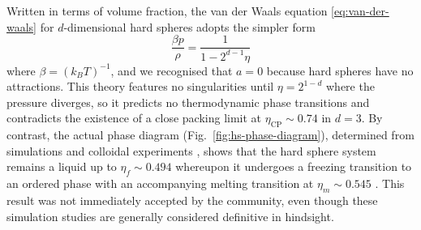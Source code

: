 \documentclass[11pt,twoside]{report}
\begin{document}
Written in terms of volume fraction, the van der Waals equation \eqref{eq:van-der-waals} for $d$-dimensional hard spheres adopts the simpler form%
\begin{equation}\label{eq:van-der-waals-hs}
  \frac{\beta p}{\rho} = \frac{1}{1 - 2^{d-1} \eta}
\end{equation}
where $\beta = (k_B T)^{-1}$, and we recognised that $a = 0$ because hard spheres have no attractions.
This theory features no singularities until $\eta = 2^{1-d}$ where the pressure diverges, so it predicts no thermodynamic phase transitions and contradicts the existence of a close packing limit at $\eta_\mathrm{CP} \sim 0.74$ in $d=3$.
By contrast, the actual phase diagram (Fig.\ \ref{fig:hs-phase-diagram}), determined from simulations \cite{AlderJCP1957,WoodJCP1957,HooverJCP1968} and colloidal experiments \cite{PuseyN1986}, shows that the hard sphere system remains a liquid%
up to $\eta_f \sim 0.494$ whereupon it undergoes a freezing transition to an ordered phase with an accompanying melting transition at $\eta_m \sim 0.545$ \cite{HooverJCP1968}.
This result was not immediately accepted by the community, even though these simulation studies are generally considered definitive in hindsight.
\end{document}
